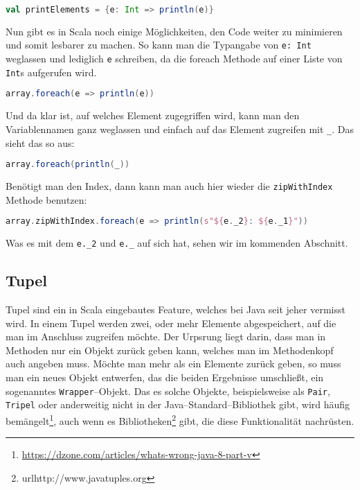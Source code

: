 \begin{lstlisting}[language=Scala,numbers=none]
val printElements = {e: Int => println(e)}
\end{lstlisting}

Nun gibt es in Scala noch einige Möglichkeiten, den Code weiter zu minimieren und somit lesbarer zu machen. So kann man die Typangabe von \texttt{e: Int} weglassen und lediglich \texttt{e} schreiben, da die foreach Methode auf einer Liste von \texttt{Int}s aufgerufen wird.

\begin{lstlisting}[language=Scala,numbers=none]
array.foreach(e => println(e))
\end{lstlisting}

Und da klar ist, auf welches Element zugegriffen wird, kann man den Variablennamen ganz weglassen und einfach auf das Element zugreifen mit \texttt{\_}. Das sieht das so aus:

\begin{lstlisting}[language=Scala,numbers=none]
array.foreach(println(_))
\end{lstlisting}

Benötigt man den Index, dann kann man auch hier wieder die \texttt{zipWithIndex} Methode benutzen:

\begin{lstlisting}[language=Scala,numbers=none]
array.zipWithIndex.foreach(e => println(s"${e._2}: ${e._1}"))
\end{lstlisting}

Was es mit dem \texttt{e.\_2} und \texttt{e.\_} auf sich hat, sehen wir im kommenden Abschnitt.

\subsection{Tupel}
Tupel sind ein in Scala eingebautes Feature, welches bei Java seit jeher vermisst wird. In einem Tupel werden zwei, oder mehr Elemente abgespeichert, auf die man im Anschluss zugreifen möchte. Der Urpsrung liegt darin, dass man in Methoden nur ein Objekt zurück geben kann, welches man im Methodenkopf auch angeben muss. Möchte man mehr als ein Elemente zurück geben, so muss man ein neues Objekt entwerfen, das die beiden Ergebnisse umschließt, ein sogenanntes \texttt{Wrapper}--Objekt. Das es solche Objekte, beispielsweise als \texttt{Pair}, \texttt{Tripel} oder anderweitig nicht in der Java--Standard--Bibliothek gibt, wird häufig bemängelt\footnote{\url{https://dzone.com/articles/whats-wrong-java-8-part-v}}, auch wenn es Bibliotheken\footnote{url{http://www.javatuples.org}} gibt, die diese Funktionalität nachrüsten.

